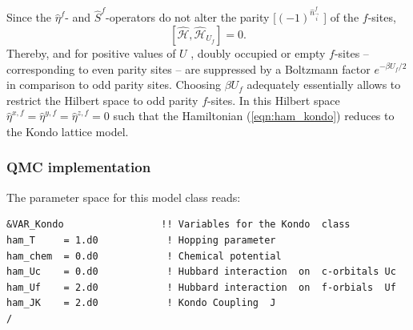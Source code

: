  Since the $\hat{\eta}^{f} $- and $ \hat{S}^{f} $-operators  do not alter the  parity [$(-1)^{\hat{n}^{f}_{\vec{i}}}$ ] of the $f$-sites, 
 \begin{equation}
 	\left[  \hat{\mathcal{H}}, \hat{\mathcal{H}}_{U_f} \right] = 0.
 \end{equation}
 Thereby,  and for positive values of $U$ ,  doubly occupied  or empty $f$-sites -- corresponding to even parity sites -- are suppressed  by a  Boltzmann factor 
 $e^{-\beta U_f/2} $ in comparison to odd parity sites.   Choosing $\beta U_f $ adequately essentially allows to  restrict the Hilbert space to  odd parity $f$-sites.  
 In this Hilbert space $\hat{\eta}^{x,f} = \hat{\eta}^{y,f} =  \hat{\eta}^{z,f} =0$  such that the Hamiltonian (\ref{eqn:ham_kondo}) reduces to the Kondo lattice model. 


\subsubsection*{ QMC implementation } 

The parameter space for this model class  reads: 

\begin{lstlisting}[style=fortran,escapechar=\#,breaklines=true]
&VAR_Kondo                 !! Variables for the Kondo  class
ham_T     = 1.d0            ! Hopping parameter
ham_chem  = 0.d0            ! Chemical potential
ham_Uc    = 0.d0            ! Hubbard interaction  on  c-orbitals Uc
ham_Uf    = 2.d0            ! Hubbard interaction  on  f-orbials  Uf
ham_JK    = 2.d0            ! Kondo Coupling  J
/
\end{lstlisting}

